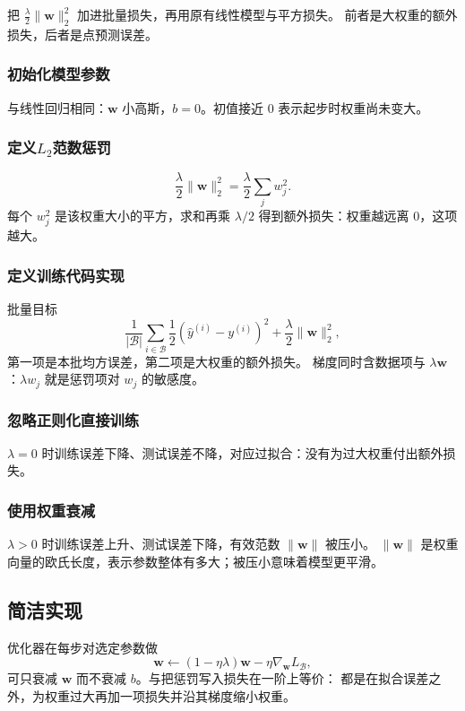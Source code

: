 把 $\frac{\lambda}{2}\|\bm{w}\|_{2}^{2}$ 加进批量损失，再用原有线性模型与平方损失。
前者是大权重的额外损失，后者是点预测误差。

\subsubsection{初始化模型参数}

与线性回归相同：$\bm{w}$ 小高斯，$b=0$。初值接近 $0$ 表示起步时权重尚未变大。

\subsubsection{\texorpdfstring{定义$L_2$范数惩罚}{定义L2范数惩罚}}

\[
\frac{\lambda}{2}\|\bm{w}\|_{2}^{2}=\frac{\lambda}{2}\sum_{j}w_{j}^{2}.
\]
每个 $w_j^2$ 是该权重大小的平方，求和再乘 $\lambda/2$ 得到额外损失：权重越远离 $0$，这项越大。

\subsubsection{定义训练代码实现}

批量目标
\[
\frac{1}{|\mathcal{B}|}\sum_{i\in\mathcal{B}}\frac{1}{2}(\hat{y}^{(i)}-y^{(i)})^{2}
+\frac{\lambda}{2}\|\bm{w}\|_{2}^{2},
\]
第一项是本批均方误差，第二项是大权重的额外损失。
梯度同时含数据项与 $\lambda\bm{w}$：$\lambda w_j$ 就是惩罚项对 $w_j$ 的敏感度。

\subsubsection{忽略正则化直接训练}

$\lambda=0$ 时训练误差下降、测试误差不降，对应过拟合：没有为过大权重付出额外损失。

\subsubsection{使用权重衰减}

$\lambda>0$ 时训练误差上升、测试误差下降，有效范数 $\|\bm{w}\|$ 被压小。
$\|\bm{w}\|$ 是权重向量的欧氏长度，表示参数整体有多大；被压小意味着模型更平滑。

\subsection{简洁实现}

优化器在每步对选定参数做
\[
\bm{w}\leftarrow(1-\eta\lambda)\bm{w}-\eta\nabla_{\bm{w}}L_{\mathcal{B}},
\]
可只衰减 $\bm{w}$ 而不衰减 $b$。与把惩罚写入损失在一阶上等价：
都是在拟合误差之外，为权重过大再加一项损失并沿其梯度缩小权重。

